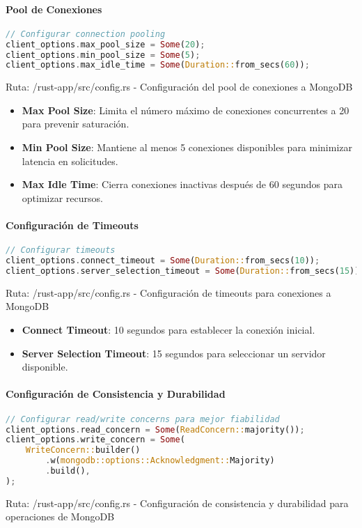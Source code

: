 \documentclass[12pt,letterpaper]{article}
\begin{document}
\paragraph{Pool de Conexiones}
\begin{lstlisting}[language=rust]
// Configurar connection pooling
client_options.max_pool_size = Some(20);
client_options.min_pool_size = Some(5);
client_options.max_idle_time = Some(Duration::from_secs(60));
\end{lstlisting}
\small{Ruta: /rust-app/src/config.rs - Configuración del pool de conexiones a MongoDB}

\begin{itemize}
    \item \textbf{Max Pool Size}: Limita el número máximo de conexiones concurrentes a 20 para prevenir saturación.
    \item \textbf{Min Pool Size}: Mantiene al menos 5 conexiones disponibles para minimizar latencia en solicitudes.
    \item \textbf{Max Idle Time}: Cierra conexiones inactivas después de 60 segundos para optimizar recursos.
\end{itemize}

\paragraph{Configuración de Timeouts}
\begin{lstlisting}[language=rust]
// Configurar timeouts
client_options.connect_timeout = Some(Duration::from_secs(10));
client_options.server_selection_timeout = Some(Duration::from_secs(15));
\end{lstlisting}
\small{Ruta: /rust-app/src/config.rs - Configuración de timeouts para conexiones a MongoDB}

\begin{itemize}
    \item \textbf{Connect Timeout}: 10 segundos para establecer la conexión inicial.
    \item \textbf{Server Selection Timeout}: 15 segundos para seleccionar un servidor disponible.
\end{itemize}

\paragraph{Configuración de Consistencia y Durabilidad}
\begin{lstlisting}[language=rust]
// Configurar read/write concerns para mejor fiabilidad
client_options.read_concern = Some(ReadConcern::majority());
client_options.write_concern = Some(
    WriteConcern::builder()
        .w(mongodb::options::Acknowledgment::Majority)
        .build(),
);
\end{lstlisting}
\small{Ruta: /rust-app/src/config.rs - Configuración de consistencia y durabilidad para operaciones de MongoDB}
\end{document}
